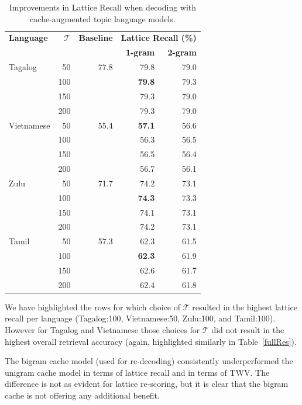 \begin{table}
\centering
   \begin{tabular}{lrrrr} \toprule
   \textbf{Language} & $\mathcal{T}$ & \textbf{Baseline} & \multicolumn{2}{c}{\textbf{Lattice Recall (\%) }} \\
   & & & \textbf{1-gram} & \textbf{2-gram} \\ \midrule
	Tagalog & 50 & 77.8 & 79.8 & 79.0 \\ 
	   \rowcolor{blue!5}	& 100 & &\textbf{79.8} & 79.3 \\
		& 150 & & 79.3 & 79.0 \\
		& 200 & & 79.3 & 79.0\\
	   \rowcolor{blue!5} Vietnamese & 50 & 55.4  & \textbf{57.1} & 56.6 \\
	         & 100 & & 56.3 & 56.5 \\
	         & 150 & & 56.5 & 56.4 \\
	         & 200 & & 56.7 & 56.1\\
	Zulu   & 50&  71.7 & 74.2 & 73.1 \\
   \rowcolor{blue!5}	& 100 & & \textbf{74.3} & 73.3 \\
	& 150 & & 74.1 & 73.1\\
	& 200 & & 74.2 & 73.1\\
	Tamil &  50 & 57.3 & 62.3 & 61.5 \\ 
   \rowcolor{blue!5} & 100 & &\textbf{ 62.3} & 61.9 \\
	& 150 & & 62.6 & 61.7 \\
	& 200 &  & 62.4 & 61.8 \\\bottomrule
	
    \end{tabular}
\caption[Improvements in Lattice Recall with joint cache-topic models]{Improvements in Lattice Recall when decoding with cache-augmented topic language models. \label{fig7:lrecall}}
\end{table}

We have highlighted the rows for which choice of $\mathcal{T}$ resulted in the highest lattice recall per language (Tagalog:100, Vietnamese:50, Zulu:100, and Tamil:100).   However for Tagalog and Vietnamese those choices for $\mathcal{T}$ did not result in the highest overall retrieval accuracy (again, highlighted similarly in Table~\ref{fullRes}).  

The bigram cache model (used for re-decoding) consistently underperformed the unigram cache model in terms of lattice recall and in terms of TWV.  The difference is not as evident for lattice re-scoring, but it is clear that the bigram cache is not offering any additional benefit.

